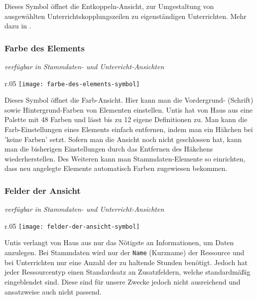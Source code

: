 \noindent
Dieses Symbol öffnet die Entkoppeln-Ansicht, zur Umgestaltung von ausgewählten Unterrichtskopplungszeilen zu eigenständigen Unterrichten. Mehr dazu in .

\subsubsection{Farbe des Elements}
{\small\textit{verfügbar in Stammdaten- und Unterricht-Ansichten\\}\par}

\begin{wrapfigure}{r}{.05\textwidth}
	\vspace{-50pt}
	\texttt{[image: farbe-des-elements-symbol]}
	\vspace{-35pt}
\end{wrapfigure}

\noindent
Dieses Symbol öffnet die Farb-Ansicht. Hier kann man die Vordergrund- (Schrift) sowie Hintergrund-Farben von Elementen einstellen. Untis hat von Haus aus eine Palette mit 48 Farben und lässt bis zu 12 eigene Definitionen zu. Man kann die Farb-Einstellungen eines Elements einfach entfernen, indem man ein Häkchen bei 'keine Farben' setzt. Sofern man die Ansicht noch nicht geschlossen hat, kann man die bisherigen Einstellungen durch das Entfernen des Häkchens wiederherstellen. Des Weiteren kann man Stammdaten-Elemente so einrichten, dass neu angelegte Elemente automatisch Farben zugewiesen bekommen.\\

\newpage

\subsubsection{Felder der Ansicht}
\label{sec:felder-der-ansicht}
{\small\textit{verfügbar in Stammdaten- und Unterricht-Ansichten\\}\par}

\begin{wrapfigure}{r}{.05\textwidth}
	\vspace{-50pt}
	\texttt{[image: felder-der-ansicht-symbol]}
	\vspace{-35pt}
\end{wrapfigure}

\noindent
Untis verlangt von Haus aus nur das Nötigste an Informationen, um Daten anzulegen. Bei Stammdaten wird nur der \texttt{Name} (Kurzname) der Ressource und bei Unterrichten nur eine Anzahl der zu haltende Stunden benötigt. Jedoch hat jeder Ressourcentyp einen Standardsatz an Zusatzfeldern, welche standardmäßig eingeblendet sind. Diese sind für unsere Zwecke jedoch nicht ausreichend und ansatzweise auch nicht passend.\\

